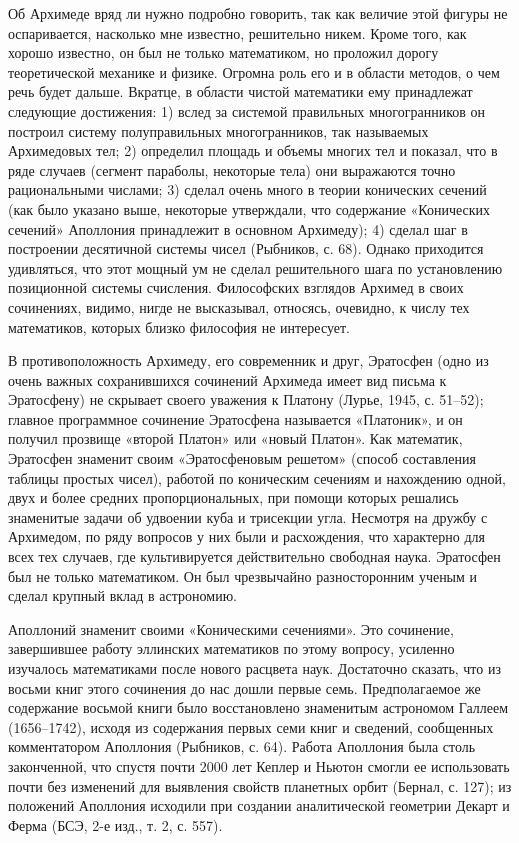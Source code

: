 Об  Архимеде вряд  ли нужно  подробно говорить,  так как  величие этой
фигуры  не оспаривается,  насколько  мне  известно, решительно  никем.
Кроме  того,  как  хорошо  известно, он  был  не  только  математиком,
но  проложил  дорогу теоретической  механике  и  физике. Огромна  роль
его  и  в  области  методов,  о чем  речь  будет  дальше.  Вкратце,  в
области  чистой математики  ему принадлежат  следующие достижения:  1)
вслед  за  системой  правильных  многогранников  он  построил  систему
полуправильных  многогранников,  так  называемых Архимедовых  тел;  2)
определил площадь  и объемы многих тел  и показал, что в  ряде случаев
(сегмент параболы, некоторые тела)  они выражаются точно рациональными
числами;  3)  сделал очень  много  в  теории конических  сечений  (как
было указано  выше, некоторые  утверждали, что  содержание «Конических
сечений»  Аполлония принадлежит  в основном  Архимеду); 4)  сделал шаг
в  построении  десятичной  системы  чисел (Рыбников,  с.  68).  Однако
приходится удивляться, что этот мощный  ум не сделал решительного шага
по  установлению позиционной  системы счисления.  Философских взглядов
Архимед  в своих  сочинениях, видимо,  нигде не  высказывал, относясь,
очевидно,  к  числу  тех  математиков,  которых  близко  философия  не
интересует.

В  противоположность  Архимеду,  его  современник  и  друг,  Эратосфен
(одно  из  очень важных  сохранившихся  сочинений  Архимеда имеет  вид
письма к  Эратосфену) не  скрывает своего  уважения к  Платону (Лурье,
1945, с. 51--52); главное  программное сочинение Эратосфена называется
«Платоник», и он получил прозвище  «второй Платон» или «новый Платон».
Как  математик,  Эратосфен   знаменит  своим  «Эратосфеновым  решетом»
(способ  составления таблицы  простых  чисел),  работой по  коническим
сечениям и  нахождению одной,  двух и более  средних пропорциональных,
при  помощи которых  решались  знаменитые задачи  об  удвоении куба  и
трисекции угла.  Несмотря на  дружбу с Архимедом,  по ряду  вопросов у
них  были и  расхождения, что  характерно  для всех  тех случаев,  где
культивируется действительно свободная наука.  Эратосфен был не только
математиком. Он был чрезвычайно разносторонним ученым и сделал крупный
вклад в астрономию.

Аполлоний  знаменит  своими  «Коническими сечениями».  Это  сочинение,
завершившее работу  эллинских математиков  по этому  вопросу, усиленно
изучалось математиками после нового расцвета наук. Достаточно сказать,
что  из  восьми  книг  этого  сочинения  до  нас  дошли  первые  семь.
Предполагаемое   же  содержание   восьмой  книги   было  восстановлено
знаменитым  астрономом  Галлеем  (1656--1742),  исходя  из  содержания
первых  семи  книг  и  сведений,  сообщенных  комментатором  Аполлония
(Рыбников, с. 64). Работа Аполлония была столь законченной, что спустя
почти  2000 лет  Кеплер  и  Ньютон смогли  ее  использовать почти  без
изменений для выявления  свойств планетных орбит (Бернал,  с. 127); из
положений  Аполлония  исходили  при создании  аналитической  геометрии
Декарт и Ферма (БСЭ, 2-е изд., т. 2, с. 557).

